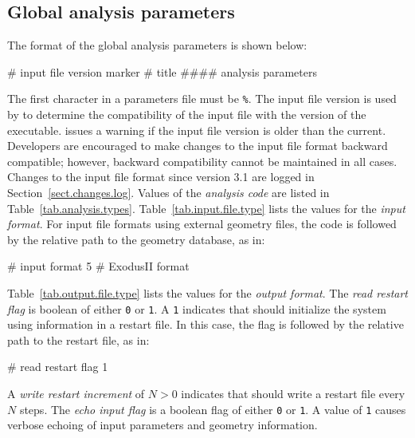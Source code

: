 \subsection{Global analysis parameters}
\label{sect.analysis.params}
The format of the global analysis parameters is shown below:
\begin{inputfile}
  # input file version marker
# title
#### analysis parameters
\end{inputfile}
The first character in a parameters file must be \texttt{\%}. The 
input file version is used by \tahoe to determine the compatibility of 
the input file with the version of the executable. \tahoe issues a 
warning if the input file version is older than the current. 
Developers are encouraged to make changes to the input file format 
backward compatible; however, backward compatibility cannot be 
maintained in all cases. Changes to the input file format since 
version 3.1 are logged in Section~\ref{sect.changes.log}.
Values of the \textit{analysis code} are listed in 
Table~\ref{tab.analysis.types}. Table~\ref{tab.input.file.type} lists 
the values for the \textit{input format}. For input file formats using 
external geometry files, the code is followed by the relative path to 
the geometry database, as in:
\begin{inputfile}
# input format
5    # ExodusII format
\end{inputfile}	
Table~\ref{tab.output.file.type} lists the values for the 
\textit{output format}. The \textit{read restart flag} is boolean of either 
\texttt{0} or \texttt{1}. A \texttt{1} indicates that \tahoe should 
initialize the system using information in a restart file. In this 
case, the flag is followed by the relative path to the restart file, 
as in:
\begin{inputfile}
# read restart flag
1   
\end{inputfile}
A \textit{write restart increment} of $N > 0$ indicates that \tahoe 
should write a restart file every $N$ steps.
The \textit{echo input flag} is a boolean flag of 
either \texttt{0} or \texttt{1}. A value of \texttt{1} causes verbose 
echoing of input parameters and geometry information.

